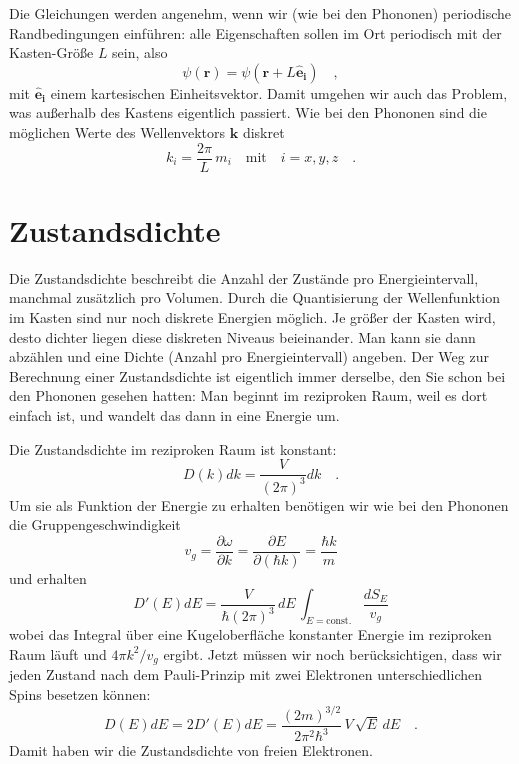 Die Gleichungen werden angenehm, wenn wir (wie bei den Phononen) periodische Randbedingungen einführen: alle Eigenschaften sollen im Ort periodisch mit der Kasten-Größe $L$ sein, also 
\begin{equation}
    \psi(\mathbf{r}) =  \psi(\mathbf{r} + L \mathbf{\hat{e}_i}) \quad ,
\end{equation}
mit $\mathbf{\hat{e}_i}$ einem kartesischen Einheitsvektor. Damit umgehen wir auch das Problem, was außerhalb des Kastens eigentlich passiert.
Wie bei den Phononen sind die möglichen Werte des Wellenvektors  $\mathbf{k}$ diskret
\begin{equation}
    k_i = \frac{2 \pi}{L} \, m_i \quad \text{mit} \quad i = x,y,z \quad . \label{eq:2:k_randbed} 
\end{equation}




\section*{Zustandsdichte}

Die Zustandsdichte beschreibt die Anzahl der Zustände pro Energieintervall, manchmal zusätzlich pro Volumen. Durch die Quantisierung der Wellenfunktion im Kasten sind nur noch diskrete Energien möglich. Je größer der Kasten wird, desto dichter liegen diese diskreten Niveaus beieinander. Man kann sie dann abzählen und eine Dichte (Anzahl pro Energieintervall) angeben. Der Weg zur Berechnung einer Zustandsdichte ist eigentlich immer derselbe, den Sie schon bei den Phononen gesehen hatten: Man beginnt im reziproken Raum, weil es dort einfach ist, und wandelt das dann in eine Energie um.

Die Zustandsdichte im reziproken Raum ist konstant:
\begin{equation}
    D(k) dk = \frac{V}{(2 \pi)^3} dk \quad .
\end{equation}
Um sie als Funktion der Energie zu erhalten benötigen wir wie bei den Phononen die Gruppengeschwindigkeit 
\begin{equation}
    v_g = \frac{\partial \omega}{ \partial k} = \frac{\partial E}{\partial (\hbar k)} = \frac{\hbar k}{m}
\end{equation}
und erhalten 
\begin{equation}
    D'(E) dE = \frac{V}{\hbar (2 \pi)^3} \, dE \, \int_{E = \text{const.}} \frac{d S_E}{v_g}  
\end{equation}
wobei das Integral über eine Kugeloberfläche konstanter Energie im reziproken Raum läuft und $4 \pi k^2 / v_g$ ergibt.
Jetzt müssen wir noch berücksichtigen, dass wir jeden Zustand nach dem Pauli-Prinzip mit zwei Elektronen unterschiedlichen Spins besetzen können:
\begin{equation}
    D(E) dE = 2 D'(E) dE =  \frac{(2m)^{3/2}}{2 \pi^2 \hbar^3} \, V \,  \sqrt{E} \, dE \quad .
\end{equation}
Damit haben wir die Zustandsdichte von freien Elektronen.

